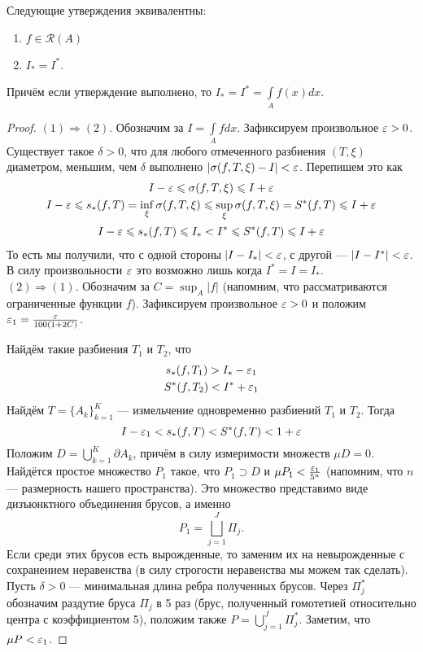 \begin{Theorem}
Следующие утверждения эквивалентны:
\begin{enumerate}
    \item $f \in \mathcal{R}(A)$
    \item $I_* = I^*$.
\end{enumerate}
Причём если утверждение выполнено, то $I_* = I^* = \int\limits_{A}f(x) dx$.
\end{Theorem}
\begin{proof}
    $(1) \Rightarrow (2)$. Обозначим за $I = \int\limits_A fdx$. Зафиксируем произвольное $\varepsilon > 0$. Существует такое $\delta > 0$, что для любого отмеченного разбиения $(T, \xi)$ диаметром, меньшим, чем $\delta$ выполнено $|\sigma(f, T, \xi) - I| < \varepsilon$. Перепишем это как
    \begin{gather}
        I - \varepsilon \leqslant \sigma(f, T, \xi) \leqslant I + \varepsilon\\
        I - \varepsilon \leqslant s_*(f, T) = \inf_\xi \sigma(f, T, \xi) \leqslant \sup_\xi \sigma(f, T, \xi) = S^*(f, T) \leqslant I +\varepsilon\\
        I - \varepsilon \leqslant s_*(f, T) \leqslant I_* < I^* \leqslant S^*(f, T) \leqslant I + \varepsilon
    \end{gather}
    То есть мы получили, что с одной стороны $|I - I_*| < \varepsilon$, с другой --- $|I - I^*| < \varepsilon$. В силу произвольности $\varepsilon$ это возможно лишь когда $I^* = I = I_*$.\\
    
    
    
    $(2) \Rightarrow (1)$. Обозначим за $C = \sup_A |f|$ (напомним, что рассматриваются ограниченные функции $f$). Зафиксируем произвольное $\varepsilon > 0$ и положим $\varepsilon_1 = \frac{\varepsilon}{100(1 + 2C)}$.

    Найдём такие разбиения $T_1$ и $T_2$, что 
    \begin{gather}
        s_*(f, T_1) > I_* - \varepsilon_1\\
        S^*(f, T_2) < I^* + \varepsilon_1
    \end{gather}
    Найдём $T = \{A_k\}_{k =1}^{K}$ --- измельчение одновременно разбиений $T_1$ и $T_2$. Тогда
    $$
        I - \varepsilon_1 < s_*(f, T) < S^*(f, T) < 1 + \varepsilon
    $$
    Положим $D = \bigcup\limits_{k=1}^K \partial A_k$, причём в силу измеримости множеств $\mu D =0$. Найдётся простое множество $P_1$ такое, что $P_1 \supset D$ и $\mu P_1 < \frac{\varepsilon_1}{5^n}$ (напомним, что $n$ --- размерность нашего пространства). Это множество представимо виде дизъюнктного объединения брусов, а именно
    \[
        P_1 = \bigsqcup\limits_{j=1}^J \Pi_j.
    \]
    Если среди этих брусов есть вырожденные, то заменим их на невырожденные с сохранением неравенства (в силу строгости неравенства мы можем так сделать). Пусть $\delta > 0$ --- минимальная длина ребра полученных брусов. Через $\Pi_j^*$ обозначим раздутие бруса $\Pi_j$ в 5 раз (брус, полученный гомотетией относительно центра с коэффициентом 5), положим также $P = \bigcup\limits_{j=1}^J \Pi_j^*$. Заметим, что $\mu P < \varepsilon_1$.
    

\end{proof}
